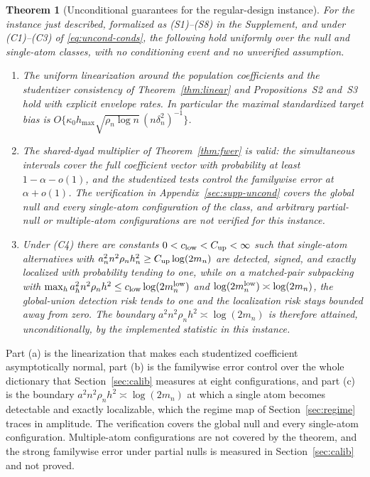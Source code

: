\documentclass[11pt]{article}
\newtheorem{theorem}{Theorem}[section]
\theoremstyle{definition}
\newcommand{\1}{\mathbf 1}\newcommand{\op}{\operatorname}
\begin{document}
\begin{theorem}[Unconditional guarantees for the regular-design instance]
\label{thm:uncond}
For the instance just described, formalized as \textup{(S1)--(S8)} in the
Supplement, and under \textup{(C1)--(C3)} of \eqref{eq:uncond-conds}, the
following hold uniformly over the null and single-atom classes, with no
conditioning event and no unverified assumption.
\begin{enumerate}[label=\textup{(\alph*)},leftmargin=2em,itemsep=2pt]
\item The uniform linearization around the population coefficients and the
studentizer consistency of Theorem~\ref{thm:linear} and
Propositions~S2 and~S3 hold with explicit envelope
rates.  In particular the maximal standardized target bias is
$O\{\kappa_0h_{\max}\sqrt{\rho_n\log n}\,(n\delta_n^2)^{-1}\}$.
\item The shared-dyad multiplier of Theorem~\ref{thm:fwer} is valid: the
simultaneous intervals cover the full coefficient vector with probability at
least $1-\alpha-o(1)$, and the studentized tests control the familywise error at
$\alpha+o(1)$.  The verification in Appendix~\ref{sec:supp-uncond} covers the global null
and every single-atom configuration of the class, and arbitrary partial-null or
multiple-atom configurations are not verified for this instance.
\item Under \textup{(C4)} there are constants $0<c_{\rm low}<C_{\rm up}<\infty$
such that single-atom alternatives with
$a_n^2n^2\rho_nh_n^2\ge C_{\rm up}\log(2m_n)$ are detected, signed, and exactly
localized with probability tending to one, while on a matched-pair subpacking
with $\max_ha_h^2n^2\rho_nh^2\le c_{\rm low}\log(2m_n^{\rm low})$ and
$\log(2m_n^{\rm low})\asymp\log(2m_n)$, the global-union detection risk tends to
one and the localization risk stays bounded away from zero.  The boundary
$a^2n^2\rho_nh^2\asymp\log(2m_n)$ is therefore attained, unconditionally, by the
implemented statistic in this instance.
\end{enumerate}
\end{theorem}

Part (a) is the linearization that makes each studentized coefficient
asymptotically normal, part (b) is the familywise error control over the
whole dictionary that Section~\ref{sec:calib} measures at eight configurations,
and part (c) is the boundary $a^2n^2\rho_nh^2\asymp\log(2m_n)$ at which a
single atom becomes detectable and exactly localizable, which the regime map
of Section~\ref{sec:regime} traces in amplitude.  The verification covers the
global null and every single-atom configuration.  Multiple-atom configurations
are not covered by the theorem, and the strong familywise error under partial
nulls is measured in Section~\ref{sec:calib} and not proved.
\end{document}
